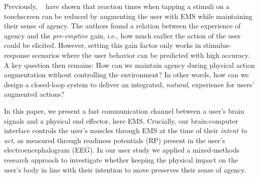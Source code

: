 Previously, ~\citet{Kasahara2019-sk} have shown that reaction times when tapping a stimuli on a touchscreen can be reduced by augmenting the user with EMS while maintaining their sense of agency. The authors found a relation between the experience of agency and the \textit{pre-emptive} gain, i.e., how much earlier the action of the user could be elicited. However, setting this gain factor only works in stimulus-response scenarios where the user behavior can be predicted with high accuracy. A key question then remains: How can we maintain agency during physical action augmentation without controlling the environment? In other words, how can we design a closed-loop system to deliver an integrated, \textit{natural}, experience for users' augmented actions?



In this paper, we present a fast communication channel between a user's brain signals and a physical end effector, here EMS. Crucially, our brain-computer interface controls the user's muscles through EMS at the time of their \textit{intent to act}, as measured through readiness potentials (RP) present in the user's electroencephalogram (EEG). In our user study we applied a mixed-methods research approach to investigate whether keeping the physical impact on the user's body in line with their intention to move preserves their sense of agency.


